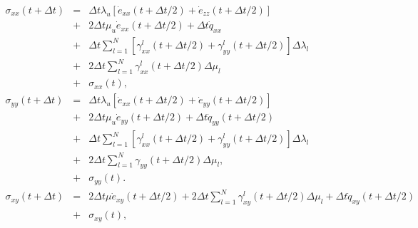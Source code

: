 \documentclass[11pt]{article}
\begin{document}
\begin{eqnarray}
  \sigma_{xx}(t+\Delta t) & = & \Delta t\lambda_u 
                               \left [
                                  \dot{e}_{xx}(t+\Delta t/2)  + 
                                  \dot{e}_{zz}(t+\Delta t/2)
                               \right]\nonumber                              \\
                          & + & 2\Delta t\mu_u \dot{e}_{xx}(t+\Delta t/2) 
                                +\Delta t\dot{q}_{xx}               \nonumber\\
                          & + & \Delta t\sum_{l=1}^N
                                 \left[\gamma^l_{xx}(t+\Delta t/2)
                                    +\gamma^l_{yy}(t+\Delta t/2)
                                 \right]
                                 \Delta\lambda_l                     \nonumber\\
                          & + &2\Delta t\sum_{l=1}^N
                                 \gamma^l_{xx}(t+\Delta t/2)
                                 \Delta\mu_l          \nonumber\\ 
                          & + &\sigma_{xx}(t),                               \\
  \sigma_{yy}(t+\Delta t) & = & \Delta t\lambda_u 
                            \left [\dot{e}_{xx}(t+\Delta t/2) 
                            + \dot{e}_{yy}(t+\Delta t/2)\right]           \\
                          & + & 2\Delta t\mu_u \dot{e}_{yy}(t+\Delta t/2) 
                             +\Delta t \dot{q}_{yy}(t+\Delta t/2) \nonumber  \\
                          & + & \Delta t\sum_{l=1}^N
                                \left[\gamma^l_{xx}(t+\Delta t/2)
                                      +\gamma^l_{yy}(t+\Delta t/2)
                                \right]
                                \Delta\lambda_l                         \nonumber\\
                          & + &  2\Delta t\sum_{l=1}^N
                                \gamma_{yy}(t+\Delta t/2)
                                \Delta\mu_l \nonumber,         \\
                          & + & \sigma_{yy}(t).\\
  \sigma_{xy}(t+\Delta t) & = & 2\Delta t\mu \dot{e}_{xy}(t+\Delta t/2) 
                               + 2\Delta t \sum_{l=1}^N
                               \gamma^l_{xy}(t+\Delta t/2)\Delta\mu_l+
                               \Delta t \dot{q}_{xy}(t+\Delta t/2)\nonumber\\ 
                          & +& \sigma_{xy}(t),\nonumber\\
                          \label{eq:stress2d}
\end{eqnarray} 
\end{document}
